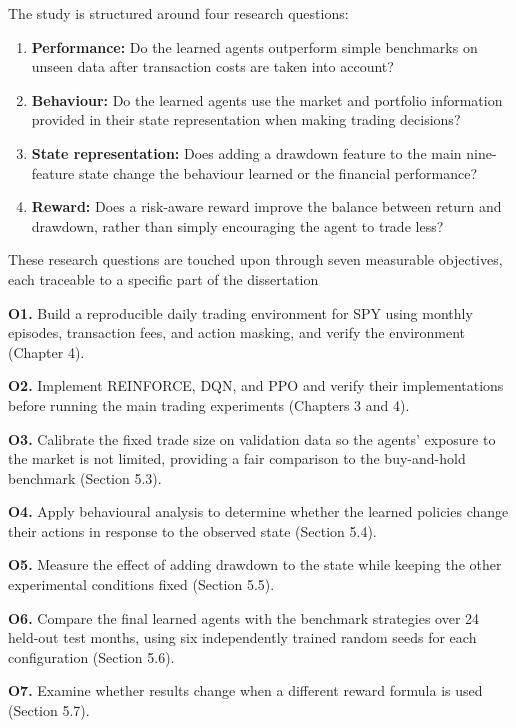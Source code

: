 The study is structured around four research questions:

\begin{enumerate}
\def\labelenumi{\arabic{enumi}.}
\item
  \textbf{Performance:} Do the learned agents outperform simple
  benchmarks on unseen data after transaction costs are taken into
  account?
\item
  \textbf{Behaviour:} Do the learned agents use the market and portfolio
  information provided in their state representation when making trading
  decisions?
\item
  \textbf{State representation:} Does adding a drawdown feature to the
  main nine-feature state change the behaviour learned or the financial
  performance?
\item
  \textbf{Reward:} Does a risk-aware reward improve the balance between
  return and drawdown, rather than simply encouraging the agent to trade
  less?
\end{enumerate}

These research questions are touched upon through seven measurable
objectives, each traceable to a specific part of the dissertation

\textbf{O1.} Build a reproducible daily trading environment for SPY
using monthly episodes, transaction fees, and action masking, and verify
the environment (Chapter 4).

\textbf{O2.} Implement REINFORCE, DQN, and PPO and verify their
implementations before running the main trading experiments (Chapters 3
and 4).

\textbf{O3.} Calibrate the fixed trade size on validation data so the
agents' exposure to the market is not limited, providing a fair
comparison to the buy-and-hold benchmark (Section 5.3).

\textbf{O4.} Apply behavioural analysis to determine whether the learned
policies change their actions in response to the observed state (Section
5.4).

\textbf{O5.} Measure the effect of adding drawdown to the state while
keeping the other experimental conditions fixed (Section 5.5).

\textbf{O6.} Compare the final learned agents with the benchmark
strategies over 24 held-out test months, using six independently trained
random seeds for each configuration (Section 5.6).

\textbf{O7.} Examine whether results change when a different reward
formula is used (Section 5.7).

